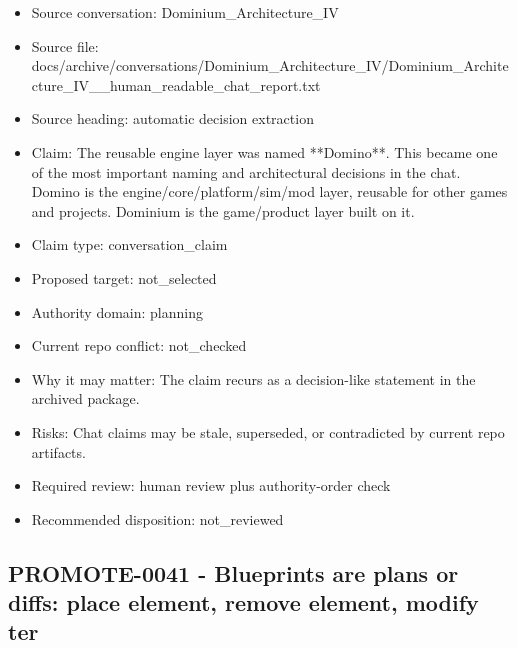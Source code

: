 \documentclass[11pt,a4paper]{report}
\begin{document}
\begin{itemize}
\item Source conversation: Dominium\_Architecture\_IV
\item Source file: docs/archive/conversations/Dominium\_Architecture\_IV/Dominium\_Architecture\_IV\_\_human\_readable\_chat\_report.txt
\item Source heading: automatic decision extraction
\item Claim: The reusable engine layer was named **Domino**. This became one of the most important naming and architectural decisions in the chat. Domino is the engine/core/platform/sim/mod layer, reusable for other games and projects. Dominium is the game/product layer built on it.
\item Claim type: conversation\_claim
\item Proposed target: not\_selected
\item Authority domain: planning
\item Current repo conflict: not\_checked
\item Why it may matter: The claim recurs as a decision-like statement in the archived package.
\item Risks: Chat claims may be stale, superseded, or contradicted by current repo artifacts.
\item Required review: human review plus authority-order check
\item Recommended disposition: not\_reviewed
\end{itemize}

\subsection{PROMOTE-0041 - Blueprints are plans or diffs: place element, remove element, modify ter}
\end{document}
